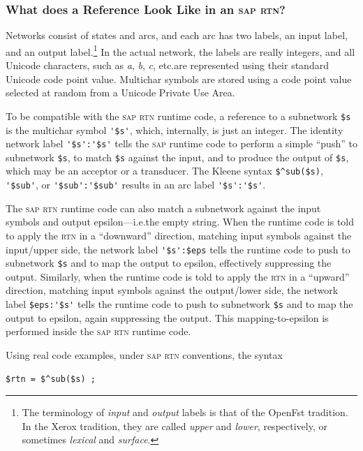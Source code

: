 \documentclass[letterpaper,12pt]{article}
\newcommand{\acro}{\textsc}
\begin{document}
\subsubsection{What does a Reference Look Like in an \acro{sap} \acro{rtn}?}

Networks consist of states and arcs, and each arc has two labels, an
input label, and an output label.\footnote{The terminology of
\emph{input} and \emph{output} labels is that of the OpenFst tradition.
In the Xerox tradition, they are called \emph{upper} and \emph{lower},
respectively, or sometimes \emph{lexical} and \emph{surface}.}  In the
actual network, the labels are really integers, and all Unicode
characters, such as \emph{a}, \emph{b}, \emph{c}, etc.\@ are represented
using their standard Unicode code point value.  Multichar symbols are
stored using a code point value selected at random from a Unicode Private
Use Area.

To be compatible with the \acro{sap} \acro{rtn} runtime code, a reference
to a subnetwork \verb!$s! is the multichar symbol \verb!'$s'!, which,
internally, is just an integer.  The identity network label
\verb!'$s':'$s'! tells the \acro{sap} runtime code to perform a simple
``push'' to subnetwork \verb!$s!, to match \verb!$s! against the input,
and to produce the output of \verb!$s!, which may be an acceptor or a
transducer.  The Kleene syntax \verb!$^sub($s)!, \verb!'$sub'!, or
\verb!'$sub':'$sub'! results in an arc label \verb!'$s':'$s'!.

The \acro{sap} \acro{rtn} runtime code can also match a subnetwork
against the input symbols and output epsilon---i.e.\@ the empty string.
When the runtime code is told to apply the \acro{rtn} in a ``downward''
direction, matching input symbols against the input/upper side, the
network label \verb!'$s':$eps! tells the runtime code to push to
subnetwork \verb!$s! and to map the output to epsilon, effectively
suppressing the output.  Similarly, when the runtime code is told to
apply the \acro{rtn} in a ``upward'' direction, matching input symbols
against the output/lower side, the network label \verb!$eps:'$s'! tells
the runtime code to push to subnetwork \verb!$s! and to map the output to
epsilon, again suppressing the output.  This mapping-to-epsilon is
performed inside the \acro{sap} \acro{rtn} runtime code.

Using real code examples, under \acro{sap} \acro{rtn} conventions, the syntax

\begin{Verbatim}[fontsize=\small]
$rtn = $^sub($s) ;
\end{Verbatim}
\end{document}
